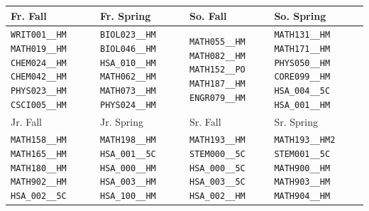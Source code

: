 \begin{tabular}{|p{}|p{}|p{}|p{}|}
    \hline
    Fr. Fall & Fr. Spring & So. Fall & So. Spring\\\hline
    \verb|WRIT001__HM| \verb|MATH019__HM| \verb|CHEM024__HM| \verb|CHEM042__HM| \verb|PHYS023__HM| \verb|CSCI005__HM|&
    \verb|BIOL023__HM| \verb|BIOL046__HM| \verb|HSA_010__HM| \verb|MATH062__HM| \verb|MATH073__HM| \verb|PHYS024__HM|&
    \verb|MATH055__HM| \verb|MATH082__HM| \verb|MATH152__PO| \verb|MATH187__HM| \verb|ENGR079__HM|&
    \verb|MATH131__HM| \verb|MATH171__HM| \verb|PHYS050__HM| \verb|CORE099__HM| \verb|HSA_004__5C| \verb|HSA_001__HM|\\
    \hline
    Jr. Fall & Jr. Spring & Sr. Fall & Sr. Spring\\\hline
    \verb|MATH158__HM| \verb|MATH165__HM| \verb|MATH180__HM| \verb|MATH902__HM| \verb|HSA_002__5C|&
    \verb|MATH198__HM| \verb|HSA_001__5C| \verb|HSA_000__HM| \verb|HSA_003__HM| \verb|HSA_100__HM|&
    \verb|MATH193__HM| \verb|STEM000__5C| \verb|HSA_000__5C| \verb|HSA_003__5C| \verb|HSA_002__HM|&
    \verb|MATH193__HM2| \verb|STEM001__5C| \verb|MATH900__HM| \verb|MATH903__HM| \verb|MATH904__HM|\\
    \hline
\end{tabular}
